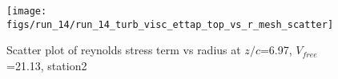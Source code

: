 \begin{figure}[H]
\centering
\texttt{[image: figs/run\_14/run\_14\_turb\_visc\_ettap\_top\_vs\_r\_mesh\_scatter]}
\caption{Scatter plot of reynolds stress term vs radius at $z/c$=6.97, $V_{free}$=21.13, station2}
\label{fig:run_14_turb_visc_ettap_top_vs_r_mesh_scatter}
\end{figure}



